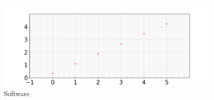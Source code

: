 \begin{figure}[h!]		
	\centering
   	\includegraphics[width=8.0in]{pictures/picture_000.png}
  	\caption{Software}
   	\label{fig:graficoST_unAcce}
\end{figure}